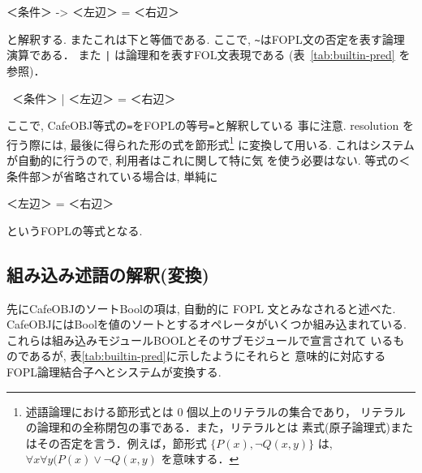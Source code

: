 \begin{vvtm}
\begin{simplev}
        ＜条件＞ -> ＜左辺＞ = ＜右辺＞ 
\end{simplev}
\end{vvtm}

と解釈する. 
またこれは下と等価である. 
ここで, \verb|~|はFOPL文の否定を表す論理演算である． 
また \verb+|+ は論理和を表すFOL文表現である
(表~\ref{tab:builtin-pred} を参照)．

\begin{vvtm}
\begin{simplev}
        ~＜条件＞ | ＜左辺＞ = ＜右辺＞
\end{simplev}
\end{vvtm}

ここで, CafeOBJ等式の\texttt{=}をFOPLの等号\texttt{=}と解釈している
事に注意. 
resolution を行う際には, 最後に得られた形の式を節形式\footnote{%
  述語論理における節形式とは 0 個以上のリテラルの集合であり，
  リテラルの論理和の全称閉包の事である．また，リテラルとは
  素式(原子論理式)またはその否定を言う．例えば，節形式
  $\{P(x), \neg Q(x,y)\}$ は, $\forall x \forall y (P(x)\lor\neg Q(x,y)$
  を意味する．
}
に変換して用いる. 
これはシステムが自動的に行うので, 利用者はこれに関して特に気
を使う必要はない. 等式の＜条件部＞が省略されている場合は, 単純に

\begin{vvtm}
\begin{simplev}
        ＜左辺＞ = ＜右辺＞
\end{simplev}
\end{vvtm}

というFOPLの等式となる. 

\subsection{組み込み述語の解釈(変換)}
\label{sec:bool-mod}

先にCafeOBJのソートBoolの項は, 自動的に FOPL 文とみなされると述べた. 
CafeOBJにはBoolを値のソートとするオペレータがいくつか組み込まれている. 
これらは組み込みモジュールBOOLとそのサブモジュールで宣言されて
いるものであるが, 表\ref{tab:builtin-pred}に示したようにそれらと
意味的に対応するFOPL論理結合子へとシステムが変換する.  

